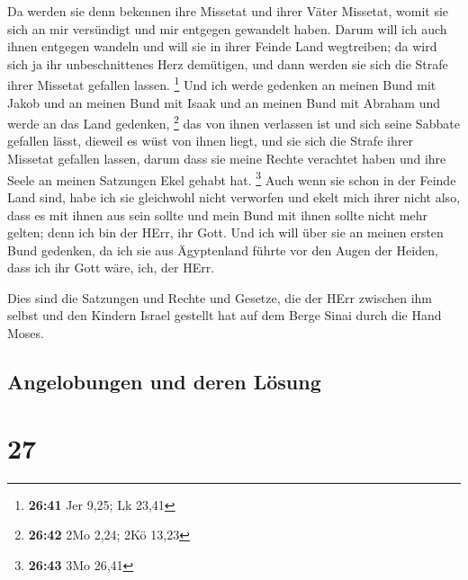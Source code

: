  Da werden sie denn bekennen ihre Missetat und ihrer
Väter Missetat, womit sie sich an mir versündigt und mir entgegen
gewandelt haben.  Darum will ich auch ihnen entgegen
wandeln und will sie in ihrer Feinde Land wegtreiben; da wird sich ja
ihr unbeschnittenes Herz demütigen, und dann werden sie sich die Strafe
ihrer Missetat gefallen lassen. \footnote{\textbf{26:41} Jer 9,25; Lk
  23,41}  Und ich werde gedenken an meinen Bund mit Jakob
und an meinen Bund mit Isaak und an meinen Bund mit Abraham und werde an
das Land gedenken, \footnote{\textbf{26:42} 2Mo 2,24; 2Kö 13,23}
 das von ihnen verlassen ist und sich seine Sabbate
gefallen lässt, dieweil es wüst von ihnen liegt, und sie sich die Strafe
ihrer Missetat gefallen lassen, darum dass sie meine Rechte verachtet
haben und ihre Seele an meinen Satzungen Ekel gehabt hat. \footnote{\textbf{26:43}
  3Mo 26,41}  Auch wenn sie schon in der Feinde Land
sind, habe ich sie gleichwohl nicht verworfen und ekelt mich ihrer nicht
also, dass es mit ihnen aus sein sollte und mein Bund mit ihnen sollte
nicht mehr gelten; denn ich bin der HErr, ihr Gott.  Und
ich will über sie an meinen ersten Bund gedenken, da ich sie aus
Ägyptenland führte vor den Augen der Heiden, dass ich ihr Gott wäre,
ich, der HErr.

 Dies sind die Satzungen und Rechte und Gesetze, die der
HErr zwischen ihm selbst und den Kindern Israel gestellt hat auf dem
Berge Sinai durch die Hand Moses.

\hypertarget{angelobungen-und-deren-luxf6sung}{%
\subsection{Angelobungen und deren
Lösung}\label{angelobungen-und-deren-luxf6sung}}

\hypertarget{section-26}{%
\section{27}\label{section-26}}

